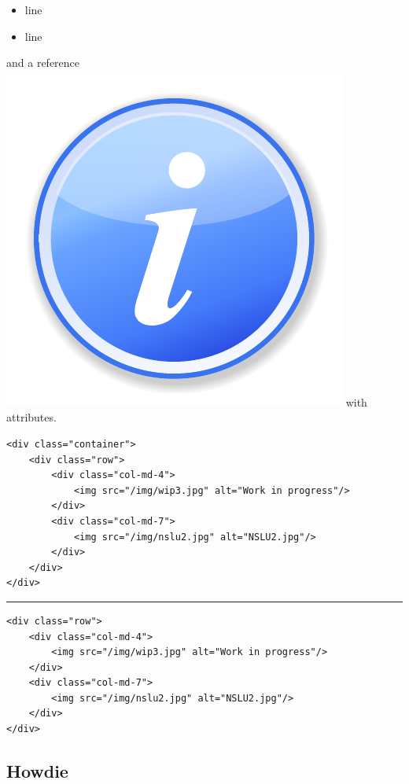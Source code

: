 \begin{itemize}
\tightlist
\item
  line
\item
  line
\end{itemize}

and a reference \includegraphics{images/information.pdf} with
attributes.\\

\begin{verbatim}
<div class="container">
    <div class="row">
        <div class="col-md-4">
			<img src="/img/wip3.jpg" alt="Work in progress"/>
		</div>
        <div class="col-md-7">
			<img src="/img/nslu2.jpg" alt="NSLU2.jpg"/>
        </div>
    </div>
</div>
\end{verbatim}

\begin{center}\rule{0.5\linewidth}{\linethickness}\end{center}

\begin{verbatim}
<div class="row">
	<div class="col-md-4">
		<img src="/img/wip3.jpg" alt="Work in progress"/>
	</div>
	<div class="col-md-7">
		<img src="/img/nslu2.jpg" alt="NSLU2.jpg"/>
	</div>
</div>
\end{verbatim}

\hypertarget{howdie}{%
\subsection{Howdie}\label{howdie}}

